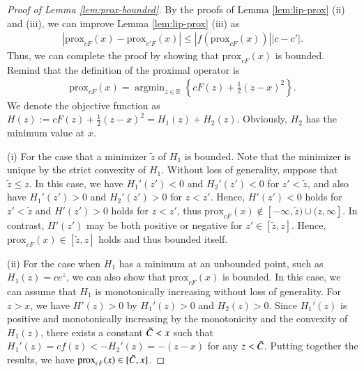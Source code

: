 \documentclass[12pt,reqno]{amsart}
\newcommand{\abs}[1]{\left\lvert#1\right\rvert}
\newcommand{\cbr}[1]{\left\{#1\right\}}
\newcommand{\R}{\mathbb{R}}
\newcommand{\prox}{\mathrm{prox}}
\DeclareMathOperator*{\argmin}{arg min}
\begin{document}
\begin{proof}[Proof of Lemma \ref{lem:prox-bounded}] By the proofs of Lemma \ref{lem:lip-prox} (ii) and (iii), we can improve Lemma \ref{lem:lip-prox} (iii) as
\begin{align*}
    \abs{\prox_{cF}(x)-\prox_{c'F}(x)}
    \le \abs{f(\prox_{cF}(x))}\abs{c-c'}.
\end{align*}
Thus, we can complete the proof by showing that $\prox_{cF}(x)$ is bounded. Remind that the definition of the proximal operator is 
\begin{align*}
    \prox_{cF}(x)=\argmin_{z\in\R}\cbr{cF(z)+\frac{1}{2}(z-x)^2}.
\end{align*}
We denote the objective function as $H(z):=cF(z)+\frac{1}{2}(z-x)^2=H_1(z)+H_2(z)$. Obviously, $H_2$ has the minimum value at $x$. 

(i) For the case that a minimizer $\tilde{z}$ of $H_1$ is bounded.
Note that the minimizer is unique by the strict convexity of $H_1$.
Without loss of generality, suppose that $\tilde{z} \leq z$.
In this case, we have $H_1'(z') < 0$ and $H_2'(z')< 0$ for $z' < \tilde{z}$, and also have $H_1'(z') > 0$ and $H_2'(z') > 0$ for $z < z'$.
Hence, $H'(z') < 0$ holds for  $z' < \tilde{z}$ and $H'(z') > 0$ holds for  $z < z'$, thus $\prox_{cF}(x)  \notin [-\infty, \tilde{z}) \cup (z, \infty] $.
In contrast, $H'(z')$ may be both positive or negative for $z' \in [\tilde{z},z]$.
Hence, $\prox_{cF}(x) \in [\tilde{z},z]$ holds and thus bounded itself.


(ii) For the case when $H_1$ has a minimum at an unbounded point, such as $H_1(z)=ce^z$, we can also show that $\prox_{cF}(x)$ is bounded. In this case, we can assume that $H_1$ is monotonically increasing without loss of generality. For $z>x$, we have $H'(z)>0$ by $H_1'(z)>0$ and $H_2(z)>0$. Since $H_1'(z)$ is positive and monotonically increasing by the monotonicity and the convexity of $H_1(z)$, there exists a constant $\Tilde{C}<x$ such that $H_1'(z)=cf(z)<-H_2'(z)=-(z-x)$ for any $z<\Tilde{C}$. Putting together the results, we have $\prox_{cF}(x)\in[\Tilde{C},x]$.
\end{proof}





\end{document}

